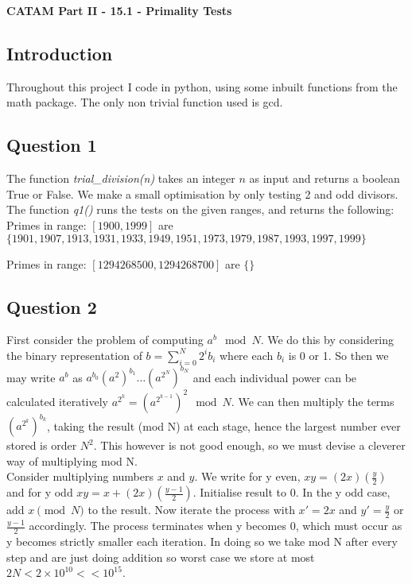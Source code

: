 \documentclass[10pt,a4paper]{report}
\begin{document}
\textbf{CATAM Part II - 15.1 - Primality Tests}

\subsection*{Introduction}

Throughout this project I code in python, using some inbuilt functions from the math package. The only non trivial function used is gcd.

\subsection*{Question 1}


The function \textit{trial\_division(n)} takes an integer $n$ as input and returns a boolean True or False. We make a small optimisation by only testing 2 and odd divisors. The function \textit{q1()} runs the tests on the given ranges, and returns the following:\\

Primes in range: $[1900, 1999]$ are  $\{1901, 1907, 1913, 1931, 1933   ,1949, 1951, 1973, 1979, 1987, 1993, 1997, 1999\}$

Primes in range: $ [1294268500, 1294268700]$ are $\{\}$

\subsection*{Question 2}

First consider the problem of computing $a^b \mod{N}$. We do this by considering the binary representation of $b = \sum_{i=0}^N 2^i b_i$ where each $b_i$ is 0 or 1. So then we may write $a^b$ as $a^{b_0} (a^2)^{b_1} \ldots (a^{2^N})^{b_N}$ and each individual power  can be calculated iteratively $a^{2^k} =  (a^{2^{k-1}})^2  \mod N$. We can then multiply the terms $(a^{2^k})^{b_k}$, taking the result (mod N) at each stage, hence the largest number ever stored is order $N^2$. This however is not good enough, so we must devise a cleverer way of multiplying mod N.\\

Consider multiplying numbers $x$ and $y$. We write for y even, $xy = (2x)(\frac{y}{2})$ and for y odd $xy = x+ (2x)(\frac{y-1}{2})$. Initialise result to 0. In the y odd case, add $x \pmod{N}$ to the result. Now iterate the process with $x'=2x$ and $y'=\frac{y}{2}$ or $\frac{y-1}{2}$ accordingly. The process terminates when y becomes 0, which must occur as y becomes strictly smaller each iteration. In doing so we take mod N after every step and are just doing addition so worst case we store at most $2N < 2\times 10^{10} << 10^{15}$.\\
\end{document}
